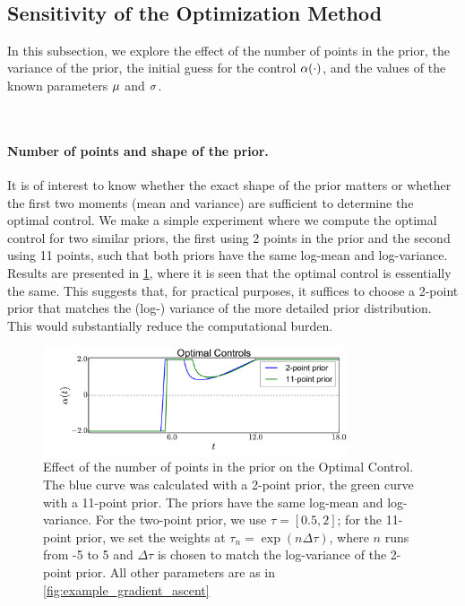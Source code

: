 \documentclass[12pt]{article}
\begin{document}
\

\subsection{Sensitivity of the Optimization Method} 
\label{subsec:optimization_sensitivity}
In this subsection, we explore the effect of the number of points
in the prior, the variance of the prior, the initial
guess for the control ${\alpha}(\cdot)$, and the values of the known
parameters ${\mu }$ and ${\sigma }$. 

\

\paragraph{Number of points and shape of the prior.} 
It is of interest to know whether the exact shape of the prior matters or whether the first two
moments (mean and variance) are sufficient to determine the optimal control. We
make a simple experiment where we compute the optimal control for two
similar priors, the first using 2 points 
in the prior and the second using 11 points, such that both priors have the
same log-mean and log-variance. Results are presented in
\cref{fig:prior_shape_impact}, where it is seen that
the optimal control is essentially the same. This suggests that, for practical
purposes, it suffices to choose a 2-point prior that matches
the (log-) variance of the more detailed prior distribution. This would
substantially reduce the computational burden.



\begin{figure}[htp]
\begin{center}
  \includegraphics[width=0.8\textwidth]{Figs/AdjointOptimizer/NumberOfTausEffect.pdf}
  \caption[Effect of number of points in prior on Optimal Control]{Effect of the
  number of points in the prior on the Optimal Control. The blue curve was calculated with a 2-point prior, the
  green curve with a 11-point prior. The priors have the same log-mean and
  log-variance. For the two-point prior, we use $\tau=[0.5,2]$; 
  for the 11-point prior, we set the weights at $\tau_n = \exp(n \Delta \tau)$,
  where $n$ runs from -5 to 5 and $\Delta \tau$ is chosen to match the
  log-variance of the 2-point prior. All other parameters are as in
  \cref{fig:example_gradient_ascent} }
  \label{fig:prior_shape_impact} 
\end{center}
\end{figure}
\end{document}
